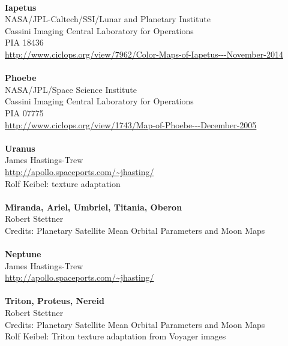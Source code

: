 \documentclass[Orbiter User Manual.tex]{subfiles}
\begin{document}
\\
\textbf{Iapetus}\\
NASA/JPL-Caltech/SSI/Lunar and Planetary Institute\\
Cassini Imaging Central Laboratory for Operations\\
PIA 18436\\
\url{http://www.ciclops.org/view/7962/Color-Maps-of-Iapetus---November-2014}\\
\\
\textbf{Phoebe}\\
NASA/JPL/Space Science Institute\\
Cassini Imaging Central Laboratory for Operations\\
PIA 07775\\
\url{http://www.ciclops.org/view/1743/Map-of-Phoebe---December-2005}\\
\\
\textbf{Uranus}\\
James Hastings-Trew\\
\url{http://apollo.spaceports.com/~jhasting/}\\
Rolf Keibel: texture adaptation\\
\\
\textbf{Miranda, Ariel, Umbriel, Titania, Oberon}\\
Robert Stettner\\
Credits: Planetary Satellite Mean Orbital Parameters and Moon Maps\\
\\
\textbf{Neptune}\\
James Hastings-Trew\\
\url{http://apollo.spaceports.com/~jhasting/}\\
\\
\textbf{Triton, Proteus, Nereid}\\
Robert Stettner\\
Credits: Planetary Satellite Mean Orbital Parameters and Moon Maps\\
Rolf Keibel: Triton texture adaptation from Voyager images
\end{document}
